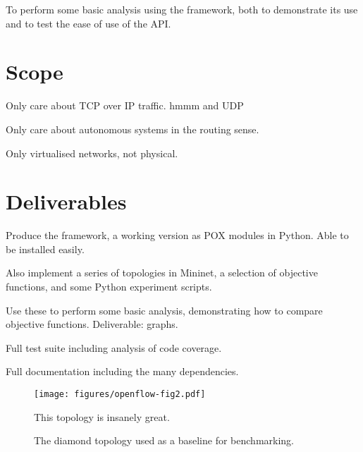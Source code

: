 To perform some basic analysis using the framework, both to demonstrate its use and to test the ease of use of the API.

\section{Scope}

Only care about TCP over IP traffic. hmmm and UDP

Only care about autonomous systems in the routing sense.

Only virtualised networks, not physical.

\section{Deliverables}

Produce the framework, a working version as POX modules in Python. Able to be installed easily.

Also implement a series of topologies in Mininet, a selection of objective functions, and some Python experiment scripts.

Use these to perform some basic analysis, demonstrating how to compare objective functions. Deliverable: graphs.

Full test suite including analysis of code coverage.

Full documentation including the many dependencies.

\begin{figure}
    \begin{center}
        \texttt{[image: figures/openflow-fig2.pdf]}
        \caption{The diamond topology used as a baseline for benchmarking.} This topology is insanely great.
    \end{center}
\end{figure}
